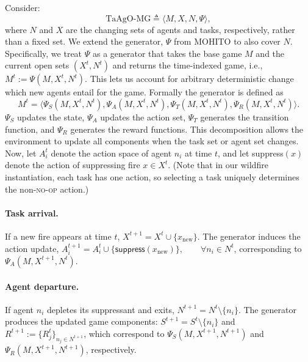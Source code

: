 Consider:
\[
\text{TaAgO-MG} \triangleq \langle M, X, N, \Psi \rangle,
\]
where $N$ and $X$ are the changing sets of agents and tasks, respectively, rather than a fixed set. We extend the generator, $\Psi$ from MOHITO \cite{anilmohito} to also cover $N$.  Specifically, we treat $\Psi$ as a generator that takes the base game $M$ and the current open sets $(X^t,N^t)$ and returns the time-indexed game, i.e., $M^t := \Psi(M, X^t, N^t)$.  This lets us account for arbitrary deterministic change which new agents entail for the game. Formally the generator is defined as
$$
M^t=\big\langle \Psi_S(M,X^t,N^t),\Psi_A(M,X^t,N^t),\Psi_T(M,X^t,N^t),\Psi_R(M,X^t,N^t)\big\rangle .
$$
$\Psi_S$ updates the state, $\Psi_A$ updates the action set, 
$\Psi_T$ generates the transition function, and $\Psi_R$ generates the reward functions.
This decomposition allows the environment to update all components when the task set or agent set changes.  Now, let $A_i^t$ denote the action space of agent $n_i$ at time $t$, and let \textsf{suppress}$(x)$ denote the action of suppressing fire $x \in X^t$. (Note that in our wildfire instantiation, each task has one action, so selecting a task uniquely determines the non-\textsc{no-op} action.)

\paragraph*{Task arrival.}
If a new fire appears at time $t$, $X^{t+1} = X^t \cup \{x_{\text{new}}\}$.  The generator induces the action update, $A_{i}^{t+1} = A_{i}^t
\cup
\{\textsf{suppress}(x_{\text{new}})\},
\qquad \forall n_i \in N^t$, corresponding to $\Psi_A(M,X^{t+1},N^t)$.

\paragraph*{Agent departure.}
If agent $n_i$ depletes its suppressant and exits, $N^{t+1} = N^t \setminus \{n_i\}$.  The generator produces the updated game components: 
$S^{t+1} = S^t \setminus \{n_i\}$ and $R^{t+1} := \{R_j^{t}\}_{n_j \in N^{t+1}}$, which correspond to $\Psi_S(M,X^{t+1},N^{t+1})$ and
$\Psi_R(M,X^{t+1},N^{t+1})$, respectively.
